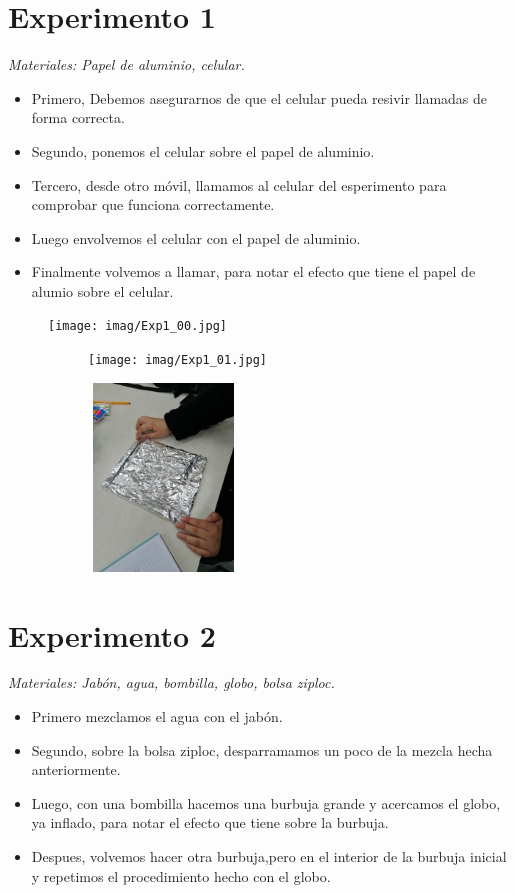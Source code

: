 \documentclass[a4paper,12pt]{article}
\begin{document}
\section*{Experimento 1}
\textit{Materiales: Papel de aluminio, celular.}
\begin{itemize}
    \item Primero, Debemos asegurarnos de que el celular pueda resivir llamadas de forma correcta.
    \item Segundo, ponemos el celular sobre el papel de aluminio.
    \item Tercero, desde otro móvil, llamamos al celular del esperimento para comprobar que funciona correctamente.
    \item Luego envolvemos el celular con el papel de aluminio.
    \item Finalmente volvemos a llamar, para notar el efecto que tiene el papel de alumio sobre el celular.
\end{itemize}
\begin{figure}[h]
    \begin{subfigure}
        \raggedright
        \texttt{[image: imag/Exp1\_00.jpg]}
        \end{subfigure}
    \begin{subfigure}
        \centering
        \texttt{[image: imag/Exp1\_01.jpg]}
    \end{subfigure}
    \begin{subfigure}
        \raggedleft
        \includegraphics[width=4cm, height=5cm]{imag/Exp1_02.jpg}
    \end{subfigure}
\end{figure}

\section*{Experimento 2}
\textit{Materiales: Jabón, agua, bombilla, globo, bolsa ziploc.}
\begin{itemize}
    \item Primero mezclamos el agua con el jabón.
    \item Segundo, sobre la bolsa ziploc, desparramamos un poco de la mezcla hecha anteriormente.
    \item Luego, con una bombilla hacemos una burbuja grande y acercamos el globo, ya inflado, para notar el efecto que tiene sobre la burbuja.
    \item Despues, volvemos hacer otra burbuja,pero en el interior de la burbuja inicial y repetimos el procedimiento hecho con el globo.
\end{itemize}
\end{document}
